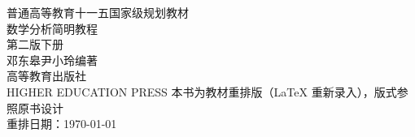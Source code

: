 \documentclass{dengbook}
\makeatletter
\let\hspace\@gobble
\makeatother
\begin{document}
\frontmatter
\pagestyle{empty}

\begin{titlepage}
  \centering
  \vspace*{2.2cm}
  {\headfont 普\hspace{0.3em}通\hspace{0.3em}高\hspace{0.3em}等\hspace{0.3em}教\hspace{0.3em}育\hspace{0.3em}十\hspace{0.3em}一\hspace{0.3em}五\hspace{0.3em}国\hspace{0.3em}家\hspace{0.3em}级\hspace{0.3em}规\hspace{0.3em}划\hspace{0.3em}教\hspace{0.3em}材}\\[3cm]
  {\headfont 数学分析简明教程}\\[1.2cm]
  {\headfont 第二版\hspace{2em}下册}\\[2.5cm]
  {\songfont 邓东皋\hspace{1em}尹小玲\hspace{1em}编著}\\[4cm]
  {\headfont 高等教育出版社}\\[0.4cm]
  {\small HIGHER EDUCATION PRESS}
  \vfill
  {\small 本书为教材重排版（LaTeX 重新录入），版式参照原书设计}\\
  {\small 重排日期：\today}
\end{titlepage}



\makeatletter
\renewcommand{\contentsname}{目\hspace{2em}录}
\makeatother
\begingroup
\pagestyle{empty}
\tableofcontents
\clearpage
\endgroup

\mainmatter
\pagestyle{fancy}
\setcounter{chapter}{9}%













\end{document}
